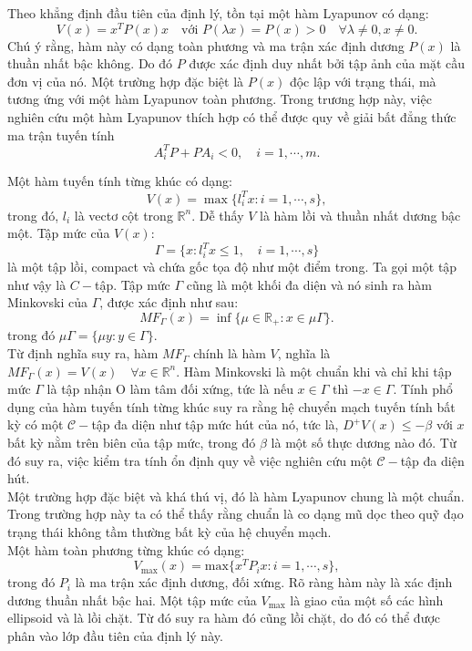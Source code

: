 \documentclass[14pt,a4paper,oneside]{report}		%
\theoremstyle{definition}
\begin{document}
Theo khẳng định đầu tiên của định lý, tồn tại một hàm Lyapunov có dạng:
$$V(x)=x^TP(x)x\quad\text{với }P(\lambda x)=P(x)>0\quad\forall\lambda\neq
 0,x\neq 0.$$
Chú ý rằng, hàm này có dạng toàn phương và ma trận xác định dương $P(x)$ là thuần nhất bậc không. Do đó $P$ được xác định duy nhất bởi tập ảnh của mặt cầu đơn vị của nó. Một trường hợp đặc biệt là $P(x)$ độc lập với trạng thái, mà tương ứng với một hàm Lyapunov toàn phương. Trong trương hợp này, việc nghiên cứu một hàm Lyapunov thích hợp có thể được quy về giải bất đẳng thức ma trận tuyến tính
$$A_i^TP+PA_i<0,\quad i=1,\cdots,m.$$

Một hàm tuyến tính từng khúc có dạng:
$$V(x)=\max\{l_i^Tx:i=1,\cdots,s\},$$
trong đó, $l_i$ là vectơ cột trong $\mathbb{R}^n$. Dễ thấy $V$ là hàm lồi và thuần nhất dương bậc một. Tập mức của $V(x)$:
$$\Gamma = \{x:l_i^Tx\leq1,\quad i=1,\cdots,s\}$$
là một tập lồi, compact và chứa gốc tọa độ như một điểm trong. Ta gọi một tập như vậy là $C-$tập. Tập mức $\Gamma$ cũng là một khối đa diện và nó sinh ra hàm Minkovski của $\Gamma$, được xác định như sau:
$$MF_\Gamma(x)=\inf\{\mu\in\mathbb{R}_+:x\in\mu\Gamma\}.$$
trong đó $\mu\Gamma = \{\mu y:y\in\Gamma\}.$\\

Từ định nghĩa suy ra, hàm $MF_\Gamma$ chính là hàm $V$, nghĩa là $MF_\Gamma(x)=V(x)\quad \forall x\in\mathbb{R}^n$. Hàm Minkovski là một chuẩn khi và chỉ khi tập mức $\Gamma$ là tập nhận O làm tâm đối xứng, tức là nếu $x\in\Gamma$ thì $-x\in\Gamma$. Tính phổ dụng của hàm tuyến tính từng khúc suy ra rằng hệ chuyển mạch tuyến tính bất kỳ có một $\mathcal{C}-$tập đa diện như tập mức hút của nó, tức là, $D^+V(x)\leq -\beta$ với $x$ bất kỳ nằm trên biên của tập mức, trong đó $\beta$ là một số thực dương nào đó. Từ đó suy ra, việc kiểm tra tính ổn định quy về việc nghiên cứu một $\mathcal{C}-$tập đa diện hút.\\

Một trường hợp đặc biệt và khá thú vị, đó là hàm Lyapunov chung là một chuẩn. Trong trường hợp này ta có thể thấy rằng chuẩn là co dạng mũ dọc theo quỹ đạo trạng thái không tầm thường bất kỳ của hệ chuyển mạch.\\

Một hàm toàn phương từng khúc có dạng:
$$V_{\text{max}} (x)=\text{max}\{x^TP_ix:i=1,\cdots,s\},$$
trong đó $P_i$ là ma trận xác định dương, đối xứng. Rõ ràng hàm này là xác định dương thuần nhất bậc hai. Một tập mức của $V_\text{max}$ là giao của một số các hình ellipsoid và là lồi chặt. Từ đó suy ra hàm đó cũng lồi chặt, do đó có thể được phân vào lớp đầu tiên của định lý này.\\
\end{document}
